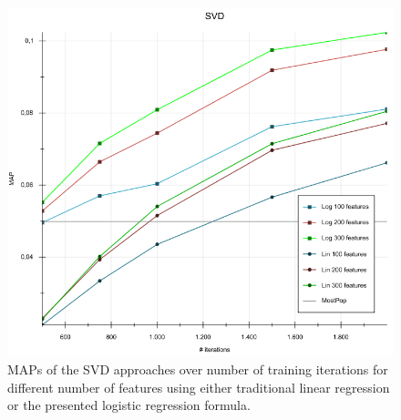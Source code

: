\documentclass[10pt]{reportMaster}
\begin{document}
\begin{figure}
	\centering
	\includegraphics[width=1\textwidth]{figures/experiments/SVDIterations}
	\caption{MAPs of the SVD approaches over number of training iterations for different number of features using either traditional linear regression or the presented logistic regression formula.}
	\label{fig:SVDIterations}
\end{figure}
\end{document}
